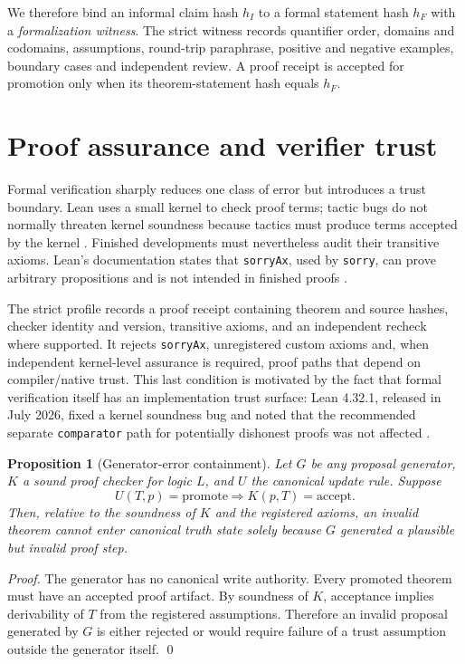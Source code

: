 \documentclass[11pt]{article}
\newtheorem{proposition}{Proposition}
\begin{document}
We therefore bind an informal claim hash $h_I$ to a formal statement hash $h_F$ with a \emph{formalization witness}. The strict witness records quantifier order, domains and codomains, assumptions, round-trip paraphrase, positive and negative examples, boundary cases and independent review. A proof receipt is accepted for promotion only when its theorem-statement hash equals $h_F$.

\section{Proof assurance and verifier trust}

Formal verification sharply reduces one class of error but introduces a trust boundary. Lean uses a small kernel to check proof terms; tactic bugs do not normally threaten kernel soundness because tactics must produce terms accepted by the kernel \cite{leanref}. Finished developments must nevertheless audit their transitive axioms. Lean's documentation states that \texttt{sorryAx}, used by \texttt{sorry}, can prove arbitrary propositions and is not intended in finished proofs \cite{leanaxioms}.

The strict profile records a proof receipt containing theorem and source hashes, checker identity and version, transitive axioms, and an independent recheck where supported. It rejects \texttt{sorryAx}, unregistered custom axioms and, when independent kernel-level assurance is required, proof paths that depend on compiler/native trust. This last condition is motivated by the fact that formal verification itself has an implementation trust surface: Lean 4.32.1, released in July 2026, fixed a kernel soundness bug and noted that the recommended separate \texttt{comparator} path for potentially dishonest proofs was not affected \cite{lean4321}.

\begin{proposition}[Generator-error containment]
Let $G$ be any proposal generator, $K$ a sound proof checker for logic $L$, and $U$ the canonical update rule. Suppose
\[
U(T,p)=\mathrm{promote}\Longrightarrow K(p,T)=\mathrm{accept}.
\]
Then, relative to the soundness of $K$ and the registered axioms, an invalid theorem cannot enter canonical truth state solely because $G$ generated a plausible but invalid proof step.
\end{proposition}

\begin{proof}
The generator has no canonical write authority. Every promoted theorem must have an accepted proof artifact. By soundness of $K$, acceptance implies derivability of $T$ from the registered assumptions. Therefore an invalid proposal generated by $G$ is either rejected or would require failure of a trust assumption outside the generator itself. \qed
\end{proof}
\end{document}
